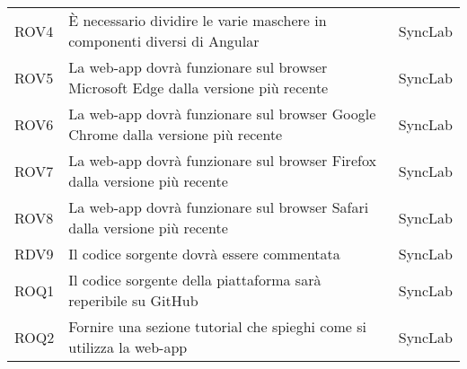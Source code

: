 \begin{center}
\begin{longtable}{ |p{1.5cm}|p{9cm}|p{1.5cm}|  }
        ROV4&È necessario dividire le varie maschere in componenti diversi di Angular&SyncLab\\
        ROV5&La web-app dovrà funzionare sul browser Microsoft Edge dalla versione più recente&SyncLab\\
        ROV6&La web-app dovrà funzionare sul browser Google Chrome dalla versione più recente&SyncLab\\
        ROV7&La web-app dovrà funzionare sul browser Firefox dalla versione più recente&SyncLab\\
        ROV8&La web-app dovrà funzionare sul browser Safari dalla versione più recente&SyncLab\\
        RDV9&Il codice sorgente dovrà essere commentata&SyncLab\\
        ROQ1&Il codice sorgente della piattaforma sarà reperibile su GitHub&SyncLab\\
        ROQ2&Fornire una sezione tutorial che spieghi come si utilizza la web-app&SyncLab\\
\hline
\end{longtable}
\end{center}